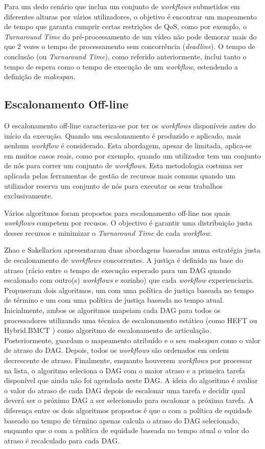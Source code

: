 Para um dedo cenário que inclua um conjunto de \textit{workflows} submetidos em diferentes alturas por vários utilizadores, o objetivo é encontrar um mapeamento de tempo que garanta cumprir certas restrições de QoS, como por exemplo, o \textit{Turnaround Time} do pré-processamento de um vídeo não pode demorar mais do que 2 vezes o tempo de processamento sem concorrência (\textit{deadline}).
O tempo de conclusão (ou \textit{Turnaround Time}), como referido anteriormente, inclui tanto o tempo de espera como o tempo de execução de um \textit{workflow}, estendendo a definição de \textit{makespan}. \cite{Kwok1999}

\subsection{Escalonamento Off-line}
O escalonamento off-line caracteriza-se por ter os \textit{workflows} disponíveis antes do início da execução. 
Quando um escalonamento é produzido e aplicado, mais nenhum \textit{workflow} é considerado. 
Esta abordagem, apesar de limitada, aplica-se em muitos casos reais, como por exemplo, quando um utilizador tem um conjunto de nós para correr um conjunto de \textit{workflows}. 
Esta metodologia costuma ser aplicada pelas ferramentas de gestão de recursos mais comuns quando um utilizador reserva um conjunto de nós para executar os seus trabalhos exclusivamente. 

Vários algoritmos foram propostos para escalonamento off-line nos quais \textit{workflows} competem por recusos. O objectivo é garantir uma distribuição justa desses recursos e minimizar o \textit{Turnaround Time} de cada \textit{workflow}. 

Zhao e Sakellariou \cite{Zhao2006} apresentaram duas abordagens baseadas numa estratégia justa de escalonamento de \textit{workflows} concorrentes. 
A justiça é definida na base do atraso (rácio entre o tempo de execução esperado para um DAG quando escalonado com outro(s) \textit{workflows} e sozinho) que cada \textit{workflow} experienciaria.
Propuseram dois algoritmos, um com uma política de justiça baseada no tempo de término e um com uma política de justiça baseada no tempo atual.
Inicialmente, ambos os algoritmos mapeiam cada DAG para todos os processadores utilizando uma técnica de escalonamento estático (como HEFT \cite{Topcuoglu2002} ou Hybrid.BMCT \cite{Sakellariou2004}) como algoritmo de escalonamento de articulação.
Posteriormente, guardam o mapeamento atribuído e o seu \textit{makespan} como o valor de atraso do DAG. Depois, todos os \textit{workflows} são ordenados em ordem decrescente de atraso. Finalmente, enquanto houverem \textit{workflows} por processar na lista, o algoritmo seleciona o DAG com o maior atraso e  a primeira tarefa disponível que ainda não foi agendada neste DAG.
A ideia do algoritmo é avaliar o valor do atraso de cada DAG depois de escalonar uma tarefa e decidir qual deverá ser o próximo DAG a ser selecionado para escalonar a próxima tarefa.
A diferença entre os dois algoritmos propostos é que o com a política de equidade baseado no tempo de término apenas calcula o atraso do DAG selecionado, enquanto que o com a política de equidade baseada no tempo atual o valor do atraso é recalculado para cada DAG.

